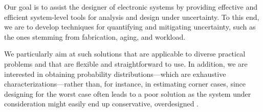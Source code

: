 Our goal is to assist the designer of electronic systems by providing effective
and efficient system-level tools for analysis and design under uncertainty. To
this end, we are to develop techniques for quantifying and mitigating
uncertainty, such as the ones stemming from fabrication, aging, and workload.

We particularly aim at such solutions that are applicable to diverse practical
problems and that are flexible and straightforward to use. In addition, we are
interested in obtaining probability distributions---which are exhaustive
characterizations---rather than, for instance, in estimating corner cases, since
designing for the worst case often leads to a poor solution as the system under
consideration might easily end up conservative, overdesigned \cite{quinton2012}.
